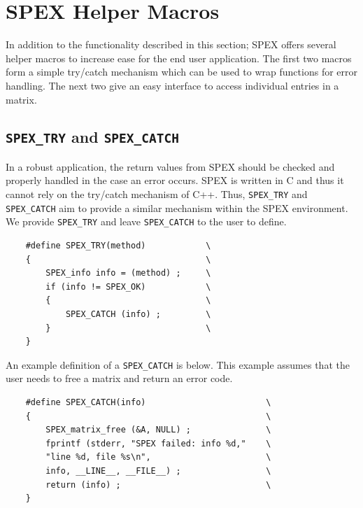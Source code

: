 \documentclass[12pt,oneside]{book}
\theoremstyle{definition}
\begin{document}
\section{SPEX Helper Macros} \label{ss:SPEX_helper_macros}

In addition to the functionality described in this section; SPEX offers several helper macros to increase ease for the end user application. The first two macros form a simple try/catch mechanism which can be used to wrap functions for error handling. The next two give an easy interface to access individual entries in a matrix.

\subsection{\texttt{SPEX\_TRY} and 
\texttt{SPEX\_CATCH}}

In a robust application, the return values from SPEX should be checked and properly handled in the case an error occurs. SPEX is written in C and thus it cannot rely on the try/catch mechanism of C++. Thus, \verb|SPEX_TRY| and \verb|SPEX_CATCH| aim to provide a similar mechanism within the SPEX environment. We provide \verb|SPEX_TRY| and leave \verb|SPEX_CATCH| to the user to define.

\newpage
\begin{mdframed}[userdefinedwidth=\textwidth]
{\footnotesize
\begin{verbatim}
    #define SPEX_TRY(method)            \
    {                                   \
        SPEX_info info = (method) ;     \
        if (info != SPEX_OK)            \
        {                               \
            SPEX_CATCH (info) ;         \
        }                               \
    }
\end{verbatim}
} \end{mdframed}

An example definition of a \verb|SPEX_CATCH| is below. This example assumes that the user needs to free a matrix and return an error code.
\begin{mdframed}[userdefinedwidth=\textwidth]
{\footnotesize
\begin{verbatim}
    #define SPEX_CATCH(info)                        \
    {                                               \
        SPEX_matrix_free (&A, NULL) ;               \
        fprintf (stderr, "SPEX failed: info %d,"    \
        "line %d, file %s\n",                       \
        info, __LINE__, __FILE__) ;                 \
        return (info) ;                             \
    } 
\end{verbatim}
} \end{mdframed}
\end{document}
